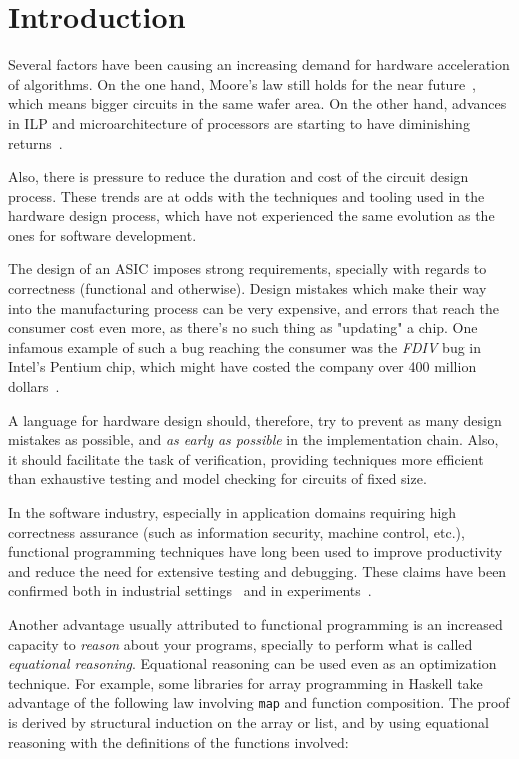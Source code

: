 \chapter{Introduction}
\label{chap:intro}
    Several factors have been causing an increasing demand for hardware acceleration of algorithms.
    On the one hand, Moore's law still holds for the near future~\cite{itrs},
    which means bigger circuits in the same wafer area.
    On the other hand, advances in \ac{ILP} and microarchitecture of processors
    are starting to have diminishing returns~\cite{dark-silicon}.

    Also, there is pressure to reduce the duration and cost of the circuit design process.
    These trends are at odds with the techniques and tooling used in the hardware design process,
    which have not experienced the same evolution as the ones for software development.

    The design of an \ac{ASIC} imposes strong requirements,
    specially with regards to correctness (functional and otherwise).
    Design mistakes which make their way into the manufacturing process can be very expensive,
    and errors that reach the consumer cost even more, as there's no such thing as "updating" a chip.
    One infamous example of such a bug reaching the consumer was the \emph{FDIV} bug in Intel's Pentium chip,
    which might have costed the company over 400 million dollars~\cite{intel-fdiv}.

    A language for hardware design should, therefore, try to prevent as many design mistakes as possible,
    and \emph{as early as possible} in the implementation chain.
    Also, it should facilitate the task of verification,
    providing techniques more efficient than exhaustive testing and model checking for circuits of fixed size.

    In the software industry, especially in application domains requiring high correctness assurance
    (such as information security, machine control, etc.),
    functional programming techniques have long been used to improve productivity
    and reduce the need for extensive testing and debugging.
    These claims have been confirmed both in industrial settings~\cite{haskell-productivity-wiger}
    and in experiments~\cite{haskell-productivity-hudak}.

    Another advantage usually attributed to functional programming is an increased capacity to
    \emph{reason} about your programs, specially to perform what is called \emph{equational reasoning}.
    Equational reasoning can be used even as an optimization technique.
    For example, some libraries for array programming in Haskell take advantage of the following
    law involving \texttt{map} and function composition.
    The proof is derived by structural induction on the array or list,
    and by using equational reasoning with the definitions of the functions involved:


